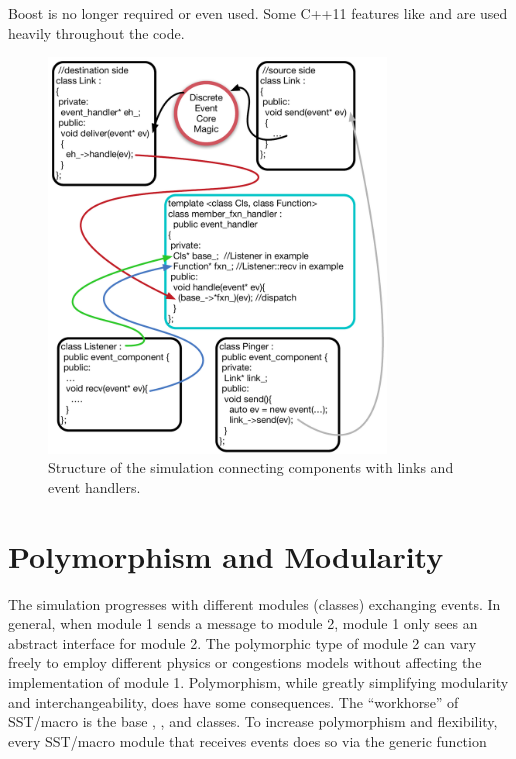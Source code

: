 Boost is no longer required or even used.
Some C++11 features like  and  are used heavily throughout the code.

\begin{figure}
\centering
\includegraphics[width=0.8\textwidth]{figures/EventHandler}
\caption{Structure of the simulation connecting components with links and event handlers.}
\label{fig:abstractHandlers}
\end{figure}

\section{Polymorphism and Modularity}\label{sec:polymorphism}
The simulation progresses with different modules (classes) exchanging events.
In general, when module 1 sends a message to module 2, module 1 only sees an abstract interface for module 2.
The polymorphic type of module 2 can vary freely to employ different physics or congestions models without affecting the implementation of module 1. 
Polymorphism, while greatly simplifying modularity and interchangeability, does have some consequences.
The ``workhorse'' of SST/macro is the base , , and  classes.
To increase polymorphism and flexibility, every SST/macro module that receives events does so via the generic function

